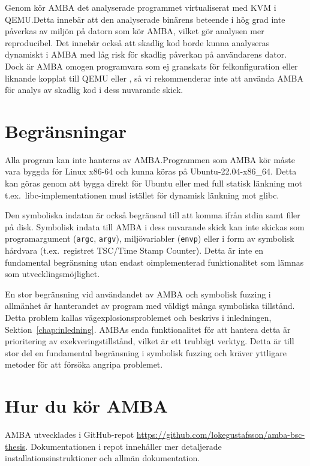Genom \stoe{} kör AMBA det analyserade programmet virtualiserat med KVM i
QEMU.\@ Detta innebär att den analyserade binärens beteende i hög grad inte
påverkas av miljön på datorn som kör AMBA, vilket gör analysen mer
reproducibel. Det innebär också att skadlig kod borde kunna analyseras dynamiskt
i AMBA med låg risk för skadlig påverkan på användarens dator. Dock är AMBA
omogen programvara som ej granskats för felkonfiguration eller liknande kopplat
till QEMU eller \stoe{}, så vi rekommenderar inte att använda AMBA för analys av
skadlig kod i dess nuvarande skick.

\section{Begränsningar}

Alla program kan inte hanteras av AMBA.\@ Programmen som AMBA kör måste vara
byggda för Linux x86-64 och kunna köras på Ubuntu-22.04-x86\_64. Detta kan göras
genom att bygga direkt för Ubuntu eller med full statisk länkning mot t.ex.\
libc-implementationen musl istället för dynamisk länkning mot glibc.

Den symboliska indatan är också begränsad till att komma ifrån stdin samt filer
på disk. Symbolisk indata till AMBA i dess nuvarande skick kan inte skickas som
programargument (\verb|argc|, \verb|argv|), miljövariabler (\verb|envp|) eller i
form av symbolisk hårdvara (t.ex.\ registret TSC/Time Stamp Counter). Detta är
inte en fundamental begränsning utan endast oimplementerad funktionalitet som
lämnas som utvecklingsmöjlighet.

En stor begränsning vid användandet av AMBA och symbolisk fuzzing i
allmänhet är hanterandet av program med väldigt många symboliska tillstånd.
Detta problem kallas vägexplosionsproblemet och beskrivs i inledningen,
Sektion~\ref{chap:inledning}. AMBAs enda funktionalitet för att hantera detta är
prioritering av exekveringstillstånd, vilket är ett trubbigt verktyg. Detta är
till stor del en fundamental begränsning i symbolisk fuzzing och kräver
yttligare metoder för att försöka angripa problemet.

\section{Hur du kör AMBA}\label{sec:run-amba}

AMBA utvecklades i GitHub-repot
\url{https://github.com/lokegustafsson/amba-bsc-thesis}. Dokumentationen i repot
innehåller mer detaljerade installationsinstruktioner och allmän dokumentation.

